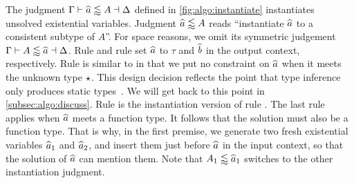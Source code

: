 The judgment $\Gamma \vdash \widehat{a} \lessapprox A \dashv \Delta$ defined in
\cref{fig:algo:instantiate} instantiates unsolved existential variables.
Judgment $\widehat{a} \lessapprox A$ reads ``instantiate $\widehat{a}$ to a consistent subtype of
$A$''. For space reasons, we omit its symmetric judgement $\Gamma \vdash A \lessapprox
\widehat{a} \dashv \Delta$.
Rule  and rule  set $\widehat{a}$ to
$\tau$ and $\widehat{b}$ in the output context, respectively.
Rule  is similar to  in that we put no
constraint on $\widehat{a}$ when it meets the unknown type $\star$. This design
decision reflects the point that type inference only produces static
types~\citep{garcia2015principal}. We will get back to this point in
\cref{subsec:algo:discuss}.
Rule  is the instantiation version of rule .
The last rule  applies when $\widehat{a}$ meets a function type. It
follows that the solution must also be a function type.
That is why, in the first premise, we generate two fresh existential variables
$\widehat{a}_1$ and $\widehat{a}_2$, and insert them just before $\widehat{a}$ in the input
context, so that the solution of $\widehat{a}$ can mention them. Note that $A_1 \lessapprox
\widehat{a}_1$ switches to the other instantiation judgment.


